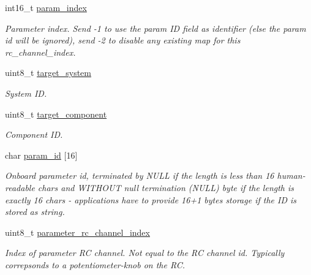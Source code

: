 \begin{DoxyCompactItemize}
int16\+\_\+t \hyperlink{struct____mavlink__param__map__rc__t_a845203e49f83bc765bcb8dcd54ae4fdd}{param\+\_\+index}
\begin{DoxyCompactList}\small\item\em Parameter index. Send -\/1 to use the param I\+D field as identifier (else the param id will be ignored), send -\/2 to disable any existing map for this rc\+\_\+channel\+\_\+index. \end{DoxyCompactList}\item 
uint8\+\_\+t \hyperlink{struct____mavlink__param__map__rc__t_a38edd34d043c0c496e9021ec2208026e}{target\+\_\+system}
\begin{DoxyCompactList}\small\item\em System I\+D. \end{DoxyCompactList}\item 
uint8\+\_\+t \hyperlink{struct____mavlink__param__map__rc__t_a130e7aa1a35686836a1a67ecd27e1366}{target\+\_\+component}
\begin{DoxyCompactList}\small\item\em Component I\+D. \end{DoxyCompactList}\item 
char \hyperlink{struct____mavlink__param__map__rc__t_a888335c93bc959e5111880b17eb85664}{param\+\_\+id} \mbox{[}16\mbox{]}
\begin{DoxyCompactList}\small\item\em Onboard parameter id, terminated by N\+U\+L\+L if the length is less than 16 human-\/readable chars and W\+I\+T\+H\+O\+U\+T null termination (N\+U\+L\+L) byte if the length is exactly 16 chars -\/ applications have to provide 16+1 bytes storage if the I\+D is stored as string. \end{DoxyCompactList}\item 
uint8\+\_\+t \hyperlink{struct____mavlink__param__map__rc__t_adf04e5719c255e3c8792da8ceab80de8}{parameter\+\_\+rc\+\_\+channel\+\_\+index}
\begin{DoxyCompactList}\small\item\em Index of parameter R\+C channel. Not equal to the R\+C channel id. Typically correpsonds to a potentiometer-\/knob on the R\+C. \end{DoxyCompactList}\end{DoxyCompactItemize}


